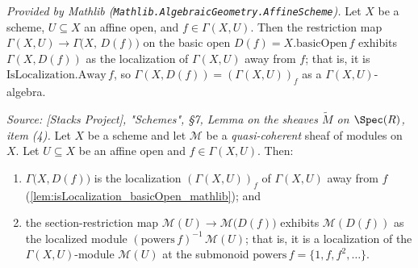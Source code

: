 \begin{lemma}
  \label{lem:isLocalization_basicOpen_mathlib}
  \mathlibok
  \textit{Provided by Mathlib
  (\texttt{Mathlib.AlgebraicGeometry.AffineScheme}).}
  Let \(X\) be a scheme, \(U \subseteq X\) an affine open, and
  \(f \in \Gamma(X, U)\). Then the restriction map
  \(\Gamma(X, U) \to \Gamma\bigl(X,\, D(f)\bigr)\) on the basic open
  \(D(f) = X.\mathrm{basicOpen}\,f\) exhibits \(\Gamma(X, D(f))\) as the
  localization of \(\Gamma(X, U)\) away from \(f\); that is, it is
  \(\mathrm{IsLocalization.Away}\,f\), so
  \(\Gamma(X, D(f)) = (\Gamma(X, U))_f\) as a \(\Gamma(X,U)\)-algebra.
\end{lemma}

\begin{lemma}
  \label{lem:qcoh_section_localization_basicOpen}
  \textit{Source: [Stacks Project], "Schemes", \S 7, Lemma on the sheaves
  \(\widetilde M\) on \(\Spec(R)\), item (4).}
  Let \(X\) be a scheme and let \(\mathcal{M}\) be a \emph{quasi-coherent} sheaf
  of modules on \(X\). Let \(U \subseteq X\) be an
  affine open and \(f \in \Gamma(X, U)\). Then:
  \begin{enumerate}
    \item \(\Gamma\bigl(X, D(f)\bigr)\) is the localization \((\Gamma(X,U))_f\)
      of \(\Gamma(X,U)\) away from \(f\)
      (\cref{lem:isLocalization_basicOpen_mathlib}); and
    \item the section-restriction map
      \(\mathcal{M}(U) \to \mathcal{M}\bigl(D(f)\bigr)\) exhibits
      \(\mathcal{M}(D(f))\) as the localized module
      \((\mathrm{powers}\,f)^{-1}\,\mathcal{M}(U)\); that is, it is a localization
      of the \(\Gamma(X,U)\)-module \(\mathcal{M}(U)\) at the submonoid
      \(\mathrm{powers}\,f = \{1, f, f^2, \dots\}\).
  \end{enumerate}
\end{lemma}

